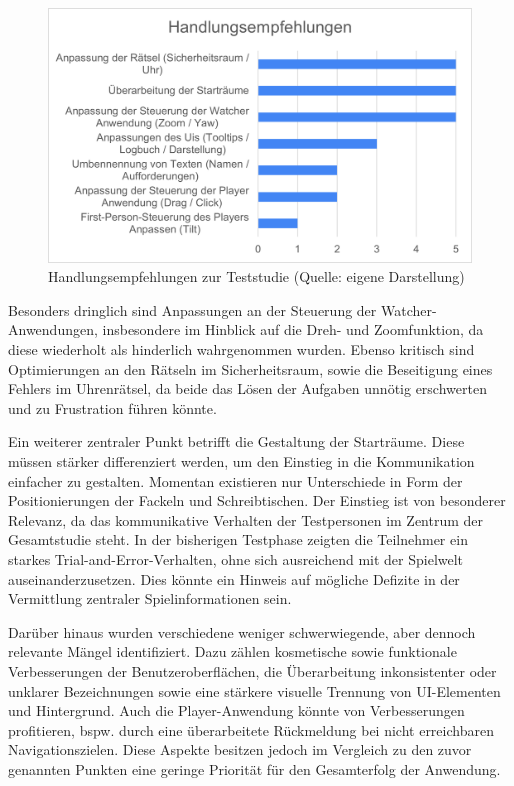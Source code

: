 \begin{figure}[ht]
\centering
\includegraphics[width=1\linewidth]{content/pictures/Handlungsempfehlung_Vorstudie.png}
\caption{Handlungsempfehlungen zur Teststudie (Quelle: eigene Darstellung)}
\label{fig:handlungsempfehlungen-vorstudie}
\end{figure}

Besonders dringlich sind Anpassungen an der Steuerung der Watcher-Anwendungen, insbesondere im Hinblick auf die Dreh- und Zoomfunktion, da diese wiederholt als hinderlich wahrgenommen wurden. Ebenso kritisch sind Optimierungen an den Rätseln im Sicherheitsraum, sowie die Beseitigung eines Fehlers im Uhrenrätsel, da beide das Lösen der
Aufgaben unnötig erschwerten und zu Frustration führen könnte.

Ein weiterer zentraler Punkt betrifft die Gestaltung der Starträume. Diese müssen stärker differenziert werden, um den Einstieg in die Kommunikation einfacher zu gestalten. Momentan existieren nur Unterschiede in Form der Positionierungen der Fackeln und Schreibtischen. Der Einstieg ist von besonderer Relevanz, da das kommunikative Verhalten der Testpersonen im Zentrum der Gesamtstudie steht. In der bisherigen Testphase zeigten die Teilnehmer ein starkes Trial-and-Error-Verhalten, ohne sich ausreichend mit der Spielwelt auseinanderzusetzen. Dies könnte ein Hinweis auf mögliche Defizite in der Vermittlung zentraler Spielinformationen sein.

Darüber hinaus wurden verschiedene weniger schwerwiegende, aber dennoch relevante Mängel identifiziert. Dazu zählen kosmetische sowie funktionale Verbesserungen der Benutzeroberflächen, die Überarbeitung inkonsistenter oder unklarer Bezeichnungen sowie eine stärkere visuelle Trennung von \ac{UI}-Elementen und Hintergrund. Auch die Player-Anwendung könnte von Verbesserungen profitieren, bspw. durch eine überarbeitete Rückmeldung bei nicht erreichbaren Navigationszielen. Diese Aspekte besitzen jedoch im Vergleich zu den zuvor genannten Punkten eine geringe Priorität für den Gesamterfolg der Anwendung.

